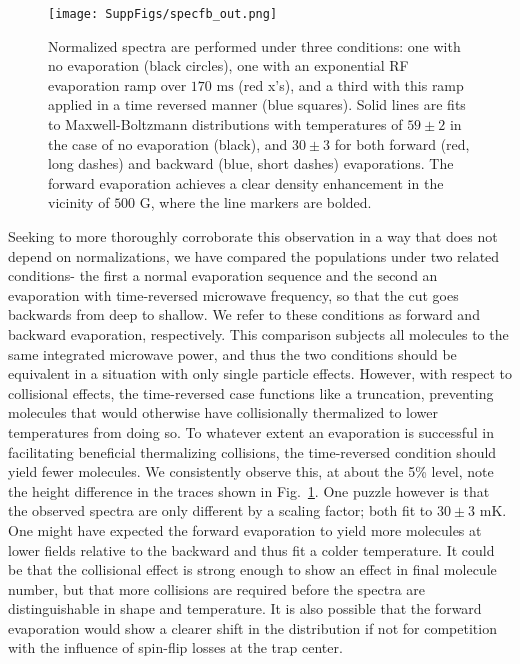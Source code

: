 \documentclass[%
 reprint,
 amsmath,amssymb,
 aps,
pra,
]{revtex4-1}
\begin{document}
\begin{figure}[tb]
\texttt{[image: SuppFigs/specfb\_out.png]}%
\caption{
Normalized spectra are performed under three conditions: one with no evaporation (black circles), one with an exponential RF evaporation ramp over $170\text{ ms}$ (red x's), and a third with this ramp applied in a time reversed manner (blue squares). Solid lines are fits to Maxwell-Boltzmann distributions with temperatures of $59\pm2$ in the case of no evaporation (black), and $30\pm3$ for both forward (red, long dashes) and backward (blue, short dashes) evaporations. The forward evaporation achieves a clear density enhancement in the vicinity of $500\text{ G}$, where the line markers are bolded. 
}
\label{fig:normenhance}
\end{figure}

Seeking to more thoroughly corroborate this observation in a way that does not depend on normalizations, we have compared the populations under two related conditions- the first a normal evaporation sequence and the second an evaporation with time-reversed microwave frequency, so that the cut goes backwards from deep to shallow.
We refer to these conditions as forward and backward evaporation, respectively.
This comparison subjects all molecules to the same integrated microwave power, and thus the two conditions should be equivalent in a situation with only single particle effects.
However, with respect to collisional effects, the time-reversed case functions like a truncation, preventing molecules that would otherwise have collisionally thermalized to lower temperatures from doing so.
To whatever extent an evaporation is successful in facilitating beneficial thermalizing collisions, the time-reversed condition should yield fewer molecules.
We consistently observe this, at about the 5\% level, note the height difference in the traces shown in Fig.~\ref{fig:normenhance}.
One puzzle however is that the observed spectra are only different by a scaling factor; both fit to $30\pm3\text{ mK}$.
One might have expected the forward evaporation to yield more molecules at lower fields relative to the backward and thus fit a colder temperature.
It could be that the collisional effect is strong enough to show an effect in final molecule number, but that more collisions are required before the spectra are distinguishable in shape and temperature.
It is also possible that the forward evaporation would show a clearer shift in the distribution if not for competition with the influence of spin-flip losses at the trap center.
\end{document}
